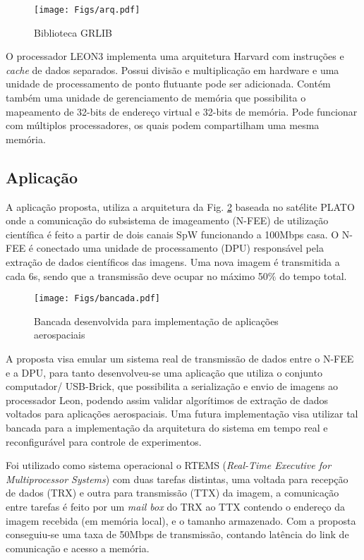 \documentclass[journal,a4paper,oneside,twocolumn]{IEEEtran}
\begin{document}
	\begin{figure}[!t]
	\centering
	\texttt{[image: Figs/arq.pdf]}
	\caption{Biblioteca GRLIB}
	\label{fig:arq}
	\end{figure}	 
	
	O processador LEON3 implementa uma arquitetura Harvard com 	instruções e \textit{cache} de dados separados. Possui divisão e multiplicação	em hardware e uma unidade de processamento de ponto flutuante pode ser 	adicionada. Contém também uma unidade de gerenciamento de memória que	possibilita o mapeamento de 32-bits de endereço virtual e 32-bits de memória. Pode funcionar com múltiplos processadores, os quais podem	compartilham uma mesma memória. 
	
\subsection{Aplicação}

	A aplicação proposta, utiliza a arquitetura da Fig. \ref{fig:bancada} baseada no satélite PLATO \cite{Plato} onde a comunicação do subsistema de imageamento (N-FEE) de utilização científica é feito a partir de dois canais SpW funcionando a 100Mbps casa. O N-FEE é conectado uma unidade de processamento (DPU) responsável pela extração de dados científicos das imagens. Uma nova imagem é transmitida a cada 6s, sendo que a transmissão deve ocupar no máximo 50$\%$ do tempo total.
	
	\begin{figure}[!t]
	\centering
	\texttt{[image: Figs/bancada.pdf]}
	\caption{Bancada desenvolvida para implementação de aplicações aerospaciais}
	\label{fig:bancada}
	\end{figure}	 
	
	A proposta visa emular um sistema real de transmissão de dados entre o N-FEE e a DPU, para tanto desenvolveu-se uma aplicação que utiliza o conjunto computador/ USB-Brick, que possibilita a serialização e envio de imagens ao processador Leon,  podendo assim validar algorítimos de extração de dados voltados para aplicações aerospaciais. Uma futura implementação visa utilizar tal bancada para a implementação da arquitetura  do sistema em tempo real e reconfigurável para controle de experimentos.
	
	Foi utilizado como sistema operacional o RTEMS (\textit{Real-Time Executive for Multiprocessor Systems}) com duas tarefas distintas, uma voltada para recepção de dados (TRX) e outra para transmissão (TTX) da imagem, a comunicação entre tarefas é feito por um \textit{mail box} do TRX ao TTX contendo o endereço da imagem recebida (em memória local), e o tamanho armazenado. Com a proposta conseguiu-se uma taxa de 50Mbps de transmissão, contando latência do link de comunicação e acesso a memória. 
	
\end{document}
